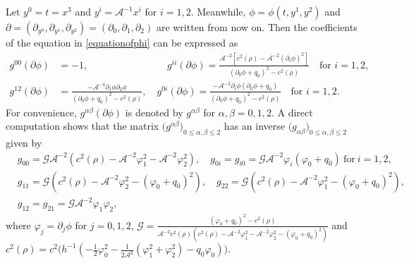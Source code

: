 \documentclass[11pt,twoside]{article}
\def\al{\alpha}
\def\vp{\varphi}
\def\f{\frac}
\def\p{\partial}
\def\dps{\displaystyle}
\begin{document}
Let $y^0=t=x^3$ and $y^i=\mathcal A^{-1}x^i$
for $i=1,2$. Meanwhile, $\phi=\phi(t,y^1,y^2)$ and $\p=(\p_{y^0}, \p_{y^1},\p_{y^2})=(\p_0,\p_1,\p_2)$ are written
from now on.
Then the coefficients of
the equation in \eqref{equationofphi} can be expressed as
\begin{equation}\label{g}
\begin{split}
g^{00}(\p\phi)&=-1, \qquad \qquad\qquad\qquad
g^{ii}(\p\phi)=\frac{\mathcal A^{-2} [c^2(\rho)-\mathcal A^{-2}\left(\partial_{i}\phi\right)^2]}{\left(\partial_{0}\phi+q_0\right)^2 - c^2(\rho)}\quad\text{for $i=1,2$},\\
g^{12}(\p\phi)&=\frac{-\mathcal A^{-4}\partial_{1}\phi\partial_{2}\phi}{\left(\partial_{0}\phi+q_0\right)^2-c^2(\rho)},\quad
g^{0i}(\p\phi)=\frac{-\mathcal A^{-2}\partial_{i}\phi\left(\partial_{0}\phi+q_0\right)}{\left(\partial_{0}\phi
+q_0\right)^2-c^2(\rho)}\quad \text{for $i=1,2$}.
\end{split}
\end{equation}
For convenience, $g^{\al\beta}(\p\phi)$ is denoted by  $g^{\al\beta}$ for $\alpha, \beta=0,1,2$.
A direct computation shows that the matrix $\big(g^{\alpha\beta}\big)_{0 \leq \alpha,\beta \leq 2}$
has an inverse $\big(g_{\alpha\beta}\big)_{0 \leq \alpha,\beta \leq 2}$ given by
\begin{equation}\label{metric}
\begin{split}
&g_{00}=\mathcal G\mathcal A^{-2}\left(c^2(\rho)-\mathcal A^{-2}\varphi_1^2-\mathcal A^{-2}\varphi_2^2\right), \quad g_{0i}=g_{i0}=\mathcal G\mathcal A^{-2}\varphi_i(\varphi_0+q_0)\ \text{for}\ i=1,2,\\
&g_{11}=\mathcal G\left(c^2(\rho)-\mathcal A^{-2}\varphi_2^2-(\varphi_0+q_0)^2\right),\quad g_{22}=\mathcal G\left(c^2(\rho)-\mathcal A^{-2}\varphi_1^2-(\varphi_0+q_0)^2\right),\\
&g_{12}=g_{21}=\mathcal G\mathcal A^{-2}\varphi_1\varphi_2,
\end{split}
\end{equation}
where $\vp_{j}=\p_{j}\phi$ for $j=0,1,2$, $\mathcal{G}=\dps\frac{(\vp_0+q_0)^2-c^2(\rho)}
{\mathcal{A}^{-2}c^2(\rho)\left(c^2(\rho)-\mathcal{A}^{-2}\vp_1^2-\mathcal{A}^{-2}\vp_2^2-(\vp_0+q_0)^2\right)}$
and $c^2(\rho)=c^2\big(h^{-1}(-\f12\vp_0^2-\f{1}{2\mathcal{A}^{2}}(\vp_1^2+\vp_2^2)-q_0\vp_0)\big)$.
\end{document}
